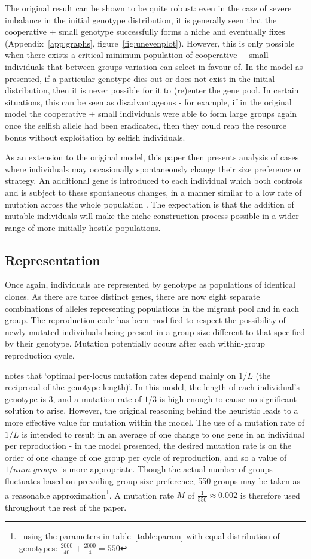 \documentclass[11pt]{article}
\begin{document}
The original result can be shown to be quite robust: even in the case of severe imbalance in the initial genotype distribution, it is generally seen that the cooperative + small genotype successfully forms a niche and eventually fixes (Appendix~\ref{app:graphs}, figure~\ref{fig:unevenplot}). However, this is only possible when there exists a critical minimum population of cooperative + small individuals that between-groups variation can select in favour of. In the model as presented, if a particular genotype dies out or does not exist in the initial distribution, then it is never possible for it to (re)enter the gene pool. In certain situations, this can be seen as disadvantageous  - for example, if in the original model the cooperative + small individuals were able to form large groups again once the selfish allele had been eradicated, then they could reap the resource bonus without exploitation by selfish individuals.

As an extension to the original model, this paper then presents analysis of cases where individuals may occasionally spontaneously change their size preference or strategy. An additional gene is introduced to each individual which both controls and is subject to these spontaneous changes, in a manner similar to a low rate of mutation across the whole population \citep{adaption}. The expectation is that the addition of mutable individuals will make the niche construction process possible in a wider range of more initially hostile populations.
\subsection{Representation}
Once again, individuals are represented by genotype as populations of identical clones. As there are three distinct genes, there are now eight separate combinations of alleles representing populations in the migrant pool and in each group. The reproduction code has been modified to respect the possibility of newly mutated individuals being present in a group size different to that specified by their genotype. Mutation potentially occurs after each within-group reproduction cycle.

\citet{optimal} notes that `optimal per-locus mutation rates depend mainly on $1/L$ (the reciprocal of the genotype length)'. In this model, the length of each individual's genotype is 3, and a mutation rate of $1/3$ is high enough to cause no significant solution to arise. %
However, the original reasoning behind the heuristic leads to a more effective value for mutation within the model. The use of a mutation rate of $1/L$ is intended to result in an average of one change to one gene in an individual per reproduction - in the model presented, the desired mutation rate is on the order of one change of one group per cycle of reproduction, and so a value of $1/num\_groups$ is more appropriate. Though the actual number of groups fluctuates based on prevailing group size preference, 550 groups may be taken as a reasonable approximation\footnote{~using the parameters in table~\ref{table:param} with equal distribution of genotypes: $\frac{2000}{40} + \frac{2000}{4} = 550$}. A mutation rate $M$ of $\frac{1}{550} \approx 0.002$ is therefore used throughout the rest of the paper.
\end{document}

